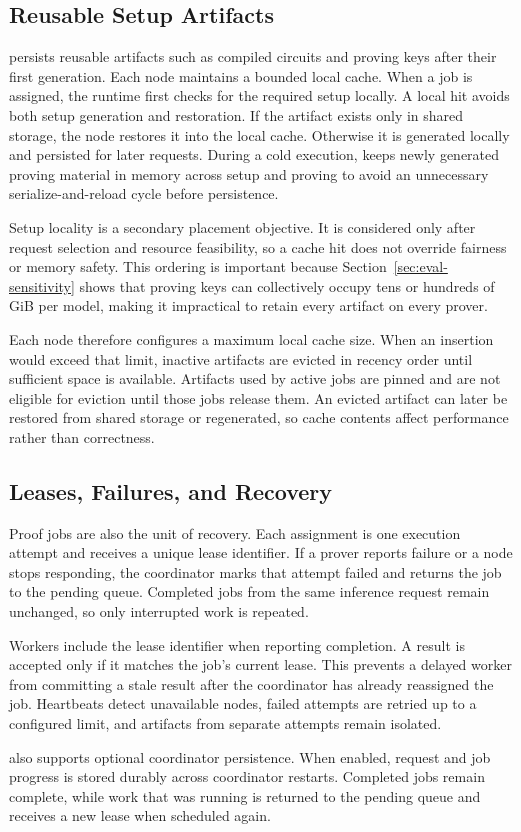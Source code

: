 \subsection{Reusable Setup Artifacts}
\label{sec:setup-reuse}

\TITLE{} persists reusable artifacts such as compiled circuits and proving keys after their first generation. Each node maintains a bounded local cache. When a job is assigned, the runtime first checks for the required setup locally. A local hit avoids both setup generation and restoration. If the artifact exists only in shared storage, the node restores it into the local cache. Otherwise it is generated locally and persisted for later requests. During a cold execution, \TITLE{} keeps newly generated proving material in memory across setup and proving to avoid an unnecessary serialize-and-reload cycle before persistence.

Setup locality is a secondary placement objective. It is considered only after request selection and resource feasibility, so a cache hit does not override fairness or memory safety. This ordering is important because Section~\ref{sec:eval-sensitivity} shows that proving keys can collectively occupy tens or hundreds of GiB per model, making it impractical to retain every artifact on every prover.

Each node therefore configures a maximum local cache size. When an insertion would exceed that limit, inactive artifacts are evicted in recency order until sufficient space is available. Artifacts used by active jobs are pinned and are not eligible for eviction until those jobs release them. An evicted artifact can later be restored from shared storage or regenerated, so cache contents affect performance rather than correctness.

\subsection{Leases, Failures, and Recovery}
\label{sec:fault-tolerance}

Proof jobs are also the unit of recovery. Each assignment is one execution attempt and receives a unique lease identifier. If a prover reports failure or a node stops responding, the coordinator marks that attempt failed and returns the job to the pending queue. Completed jobs from the same inference request remain unchanged, so only interrupted work is repeated.

Workers include the lease identifier when reporting completion. A result is accepted only if it matches the job's current lease. This prevents a delayed worker from committing a stale result after the coordinator has already reassigned the job. Heartbeats detect unavailable nodes, failed attempts are retried up to a configured limit, and artifacts from separate attempts remain isolated.

\TITLE{} also supports optional coordinator persistence. When enabled, request and job progress is stored durably across coordinator restarts. Completed jobs remain complete, while work that was running is returned to the pending queue and receives a new lease when scheduled again.
